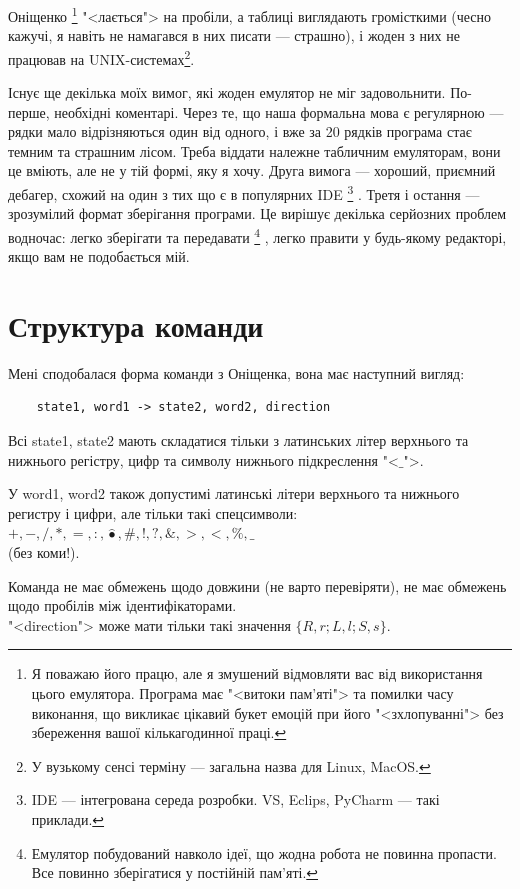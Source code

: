 \documentclass[oneside,final,14pt]{extreport}
\begin{document}
Оніщенко
\footnote{Я поважаю його працю, але я змушений відмовляти вас від використання цього емулятора. Програма має "<витоки пам'яті"> та помилки часу виконання, що викликає цікавий букет емоцій при його "<зхлопуванні"> без збереження вашої кількагодинної праці.}
 "<лається"> на пробіли, а таблиці виглядають громісткими (чесно кажучі, я навіть не намагався в них писати --- страшно), і жоден з них не працював на UNIX-системах\footnote{У вузькому сенсі терміну --- загальна назва для Linux, MacOS.}.

Існує ще декілька моїх вимог, які жоден емулятор не міг задовольнити. По-перше, необхідні коментарі. Через те, що наша формальна мова є регулярною  --- рядки мало відрізняються один від одного, і вже за 20 рядків програма стає темним та страшним лісом. Треба віддати належне табличним емуляторам, вони це вміють, але не у тій формі, яку я хочу.
Друга вимога --- хороший, приємний дебагер, схожий на один з тих що є в популярних IDE
\footnote{IDE --- інтегрована середа розробки. VS, Eclips, PyCharm --- такі приклади.}
. Третя і остання --- зрозумілий формат зберігання програми. Це вирішує декілька серйозних проблем водночас: легко зберігати та передавати
\footnote{Емулятор побудований навколо ідеї, що жодна робота не повинна пропасти. Все повинно зберігатися у постійній пам'яті.}
, легко правити у будь-якому редакторі, якщо вам не подобається мій.

\section{Структура команди}

Мені сподобалася форма команди з Оніщенка, вона має наступний вигляд:

\begin{verbatim}
	state1, word1 -> state2, word2, direction
\end{verbatim}

Всі state1, state2 мають складатися тільки з латинських літер верхнього та нижнього регістру, цифр та символу нижнього підкреслення "<$\_$">.
		
У word1, word2 також допустимі латинські літери верхнього та нижнього регистру і цифри, але тільки такі спецсимволи: $+,-,/,*,=,:,\hat{•},\#,!,?,\&,>,<,\%,\_$\\ (без коми!). 
		
Команда не має обмежень щодо довжини (не варто перевіряти), не має обмежень щодо пробілів між ідентифікаторами.
\\
"<direction">  може мати тільки такі значення $\{R,r;L,l;S,s\}$.
\end{document}

